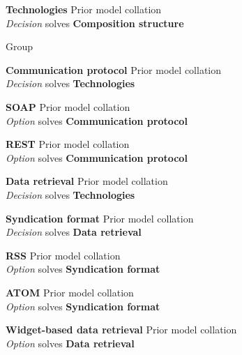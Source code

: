 \textbf{Technologies} \hfill Prior model collation \\ \emph{Decision} \hfill solves \textbf{Composition structure}

Group

\textbf{Communication protocol} \hfill Prior model collation \cite{Minhas2012} \\ \emph{Decision} \hfill solves \textbf{Technologies}


\textbf{SOAP} \hfill Prior model collation \cite{Minhas2012} \\ \emph{Option} \hfill solves \textbf{Communication protocol}

\textbf{REST} \hfill Prior model collation \cite{Minhas2012} \\ \emph{Option} \hfill solves \textbf{Communication protocol}

\textbf{Data retrieval} \hfill Prior model collation \cite{Minhas2012} \\ \emph{Decision} \hfill solves \textbf{Technologies}


\textbf{Syndication format} \hfill Prior model collation \cite{Minhas2012} \\ \emph{Decision} \hfill solves \textbf{Data retrieval}


\textbf{RSS} \hfill Prior model collation \cite{Minhas2012} \\ \emph{Option} \hfill solves \textbf{Syndication format}

\textbf{ATOM} \hfill Prior model collation \cite{Minhas2012} \\ \emph{Option} \hfill solves \textbf{Syndication format}

\textbf{Widget-based data retrieval} \hfill Prior model collation \cite{Minhas2012} \\ \emph{Option} \hfill solves \textbf{Data retrieval}

